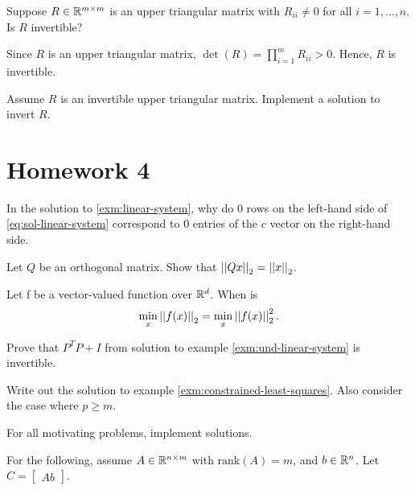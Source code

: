 \documentclass[]{book}
\theoremstyle{definition}
\theoremstyle{definition}
\theoremstyle{definition}
\theoremstyle{remark}
\let\BeginKnitrBlock\begin \let\EndKnitrBlock\end
\begin{document}
\BeginKnitrBlock{exercise}
\protect\hypertarget{exr:q307}{}{\label{exr:q307} }Suppose
\(R \in \mathbb{R}^{m\times m}\) is an upper triangular matrix with
\(R_{ii} \neq 0\) for all \(i = 1,\ldots, n\). Is \(R\) invertible?
\EndKnitrBlock{exercise}

\BeginKnitrBlock{solution}
\iffalse{} {Solution. } \fi{}Since \(R\) is an upper triangular matrix,
\(\det(R) = \prod_{i=1}^{m} R_{ii} > 0\). Hence, \(R\) is invertible.
\EndKnitrBlock{solution}

\BeginKnitrBlock{exercise}
\protect\hypertarget{exr:q308}{}{\label{exr:q308} }Assume \(R\) is an
invertible upper triangular matrix. Implement a solution to invert
\(R\).
\EndKnitrBlock{exercise}

\section{Homework 4}\label{homework-4}

\BeginKnitrBlock{exercise}
\protect\hypertarget{exr:q401}{}{\label{exr:q401} }In the solution to
\ref{exm:linear-system}, why do \(0\) rows on the left-hand side of
\eqref{eq:sol-linear-system} correspond to \(0\) entries of the \(c\)
vector on the right-hand side.
\EndKnitrBlock{exercise}

\BeginKnitrBlock{exercise}
\protect\hypertarget{exr:q402}{}{\label{exr:q402} }Let \(Q\) be an
orthogonal matrix. Show that \(\left \vert \left \vert Qx \right \vert \right \vert_2 = \left \vert \left \vert x \right \vert \right \vert_2\).
\EndKnitrBlock{exercise}

\BeginKnitrBlock{exercise}
\protect\hypertarget{exr:q403}{}{\label{exr:q403} }Let f be a vector-valued
function over \(\mathbb{R}^d\). When is
\[\min_x \left \vert \left \vert f(x) \right \vert \right \vert_2 = \min_x \left \vert \left \vert f(x) \right \vert \right \vert_2^2.\]
\EndKnitrBlock{exercise}

\BeginKnitrBlock{exercise}
\protect\hypertarget{exr:q404}{}{\label{exr:q404} }Prove that \(P^T P + I\)
from solution to example \ref{exm:und-linear-system} is invertible.
\EndKnitrBlock{exercise}

\BeginKnitrBlock{exercise}
\protect\hypertarget{exr:q405}{}{\label{exr:q405} }Write out the solution to
example \ref{exm:constrained-least-squares}. Also consider the case
where \(p \ge m\).
\EndKnitrBlock{exercise}

\BeginKnitrBlock{exercise}
\protect\hypertarget{exr:q406}{}{\label{exr:q406} }For all motivating
problems, implement solutions.
\EndKnitrBlock{exercise}

For the following, assume \(A \in \mathbb{R}^{n\times m}\) with
\(\text{rank}(A) = m\), and \(b \in \mathbb{R}^n\). Let
\(C = \begin{bmatrix} A b \end{bmatrix}\).
\end{document}
